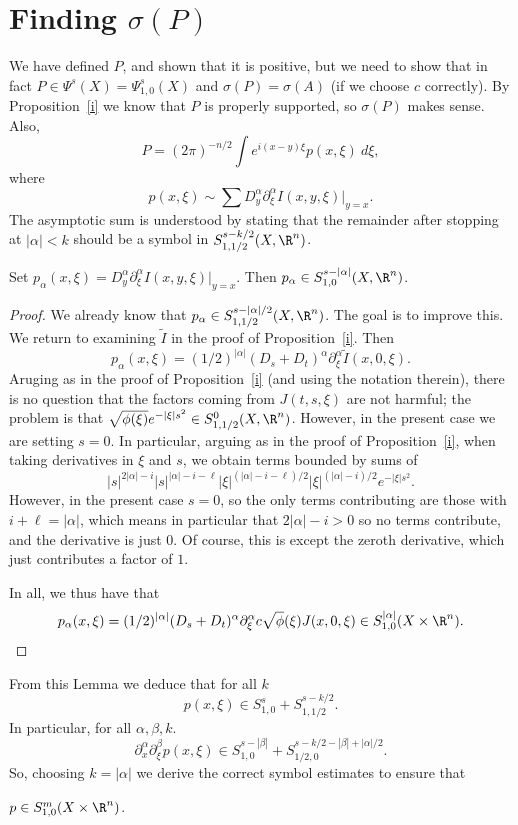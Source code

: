 \documentclass[12pt]{article}
\begin{document}
\section{Finding $\sigma(P)$}
We have defined $P$, and shown that it is positive, but we need to show that in fact $P \in \Psi^s(X) = \Psi^s_{1,0}(X)$ and $\sigma(P) = \sigma(A)$ (if we choose $c$ correctly). By Proposition~\ref{i} we know that $P$ is properly supported, so $\sigma(P)$ makes sense. Also,
\[P = (2\pi)^{-n/2}\int e^{i(x-y)\xi}p(x,\xi)\ d\xi,\]
where
\[p(x,\xi) \sim \sum D_y^{\alpha}\partial_{\xi}^{\alpha}I(x,y,\xi)|_{y=x}.\]
The asymptotic sum is understood by stating that the remainder after stopping at $|\alpha| < k$ should be a symbol in $S^{s-k/2}_{1,1/2}(X,\R^n)$.
\begin{lem}\label{j}Set $p_\alpha(x,\xi) = D_y^{\alpha}\partial_{\xi}^{\alpha}I(x,y,\xi)|_{y=x}$. Then $p_{\alpha} \in S^{s-|\alpha|}_{1,0}(X,\R^n)$.\end{lem}
\begin{proof}
We already know that $p_{\alpha} \in S^{s-|\alpha|/2}_{1,1/2}(X,\R^n)$. The goal is to improve this. We return to examining $\tilde{I}$ in the proof of Proposition~\ref{i}. Then
\[p_{\alpha}(x,\xi) = (1/2)^{|\alpha|}(D_s+D_t)^{\alpha}\partial^{\alpha}_{\xi}\tilde{I}(x,0,\xi).\]
Aruging as in the proof of Proposition~\ref{i} (and using the notation therein), there is no question that the factors coming from $J(t,s,\xi)$ are not harmful; the problem is that $\sqrt{\phi(\xi)}e^{-|\xi|s^2} \in S^{0}_{1,1/2}(X,\R^n)$. However, in the present case we are setting $s=0$. In particular, arguing as in the proof of Proposition~\ref{i}, when taking derivatives in $\xi$ and $s$, we obtain terms bounded by sums of
\[|s|^{2|\alpha|-i}|s|^{|\alpha|-i-\ell}|\xi|^{(|\alpha|-i-\ell)/2}|\xi|^{(|\alpha|-i)/2}e^{-|\xi|s^2}.\] However, in the present case $s=0$, so the only terms contributing are those with $i+\ell=|\alpha|$, which means in particular that $2|\alpha|-i > 0$  so no terms contribute, and the derivative is just $0$. Of course, this is except the zeroth derivative, which just contributes a factor of $1$.

In all, we thus have that
\[p_{\alpha}(x,\xi) =  (1/2)^{|\alpha|}(D_s+D_t)^{\alpha}\partial^{\alpha}_{\xi}c\sqrt{\phi}(\xi)J(x,0,\xi) \in S^{|\alpha|}_{1,0}(X\times \R^n).\]
\end{proof}

From this Lemma we deduce that for all $k$
\[p(x,\xi) \in S^s_{1,0} + S^{s-k/2}_{1,1/2}.\] In particular, for all $\alpha,\beta,k$.
\[\partial^{\alpha}_x\partial^{\beta}_\xi p(x,\xi) \in S^{s-|\beta|}_{1,0} + S^{s-k/2-|\beta|+|\alpha|/2}_{1/2,0}.\]
So, choosing $k = |\alpha|$ we derive the correct symbol estimates to ensure that
\begin{lem} $p \in S^m_{1,0}(X\times \R^n)$.\end{lem}
\end{document}
